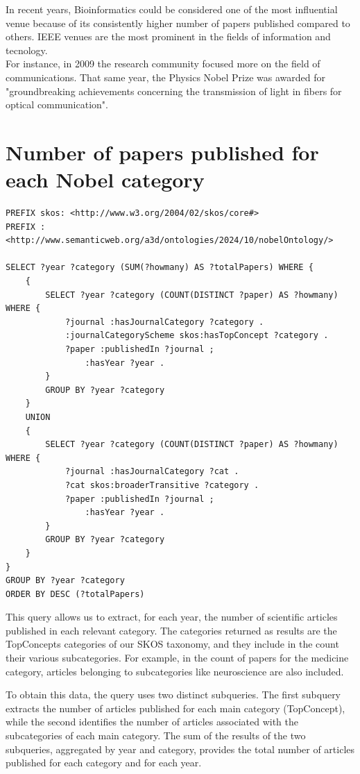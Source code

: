 \documentclass{article}
\begin{document}
In recent years, Bioinformatics could be considered one of the most influential
venue because of its consistently higher number of papers published compared to others.
IEEE venues are the most prominent in the fields of information and tecnology.\\
For instance, in 2009 the research community focused more on the field of
communications.
That same year, the Physics Nobel Prize was awarded for "groundbreaking achievements
concerning the transmission of light in fibers for optical communication".

\newpage

\section{Number of papers published for each Nobel category}
\begin{lstlisting}
PREFIX skos: <http://www.w3.org/2004/02/skos/core#>
PREFIX : <http://www.semanticweb.org/a3d/ontologies/2024/10/nobelOntology/>

SELECT ?year ?category (SUM(?howmany) AS ?totalPapers) WHERE {
    {
        SELECT ?year ?category (COUNT(DISTINCT ?paper) AS ?howmany) WHERE {
            ?journal :hasJournalCategory ?category .
            :journalCategoryScheme skos:hasTopConcept ?category .
            ?paper :publishedIn ?journal ;
                :hasYear ?year .
        }
        GROUP BY ?year ?category
    }
    UNION
    {
        SELECT ?year ?category (COUNT(DISTINCT ?paper) AS ?howmany) WHERE {
            ?journal :hasJournalCategory ?cat .
            ?cat skos:broaderTransitive ?category .
            ?paper :publishedIn ?journal ;
                :hasYear ?year .
        }
        GROUP BY ?year ?category
    }
}
GROUP BY ?year ?category
ORDER BY DESC (?totalPapers)
\end{lstlisting}

\vspace{1em}

This query allows us to extract, for each year, the number of scientific articles published in each relevant category. The categories returned
as results are the TopConcepts categories of our SKOS taxonomy, and they include in the count their various subcategories. For example, in the count
of papers for the medicine category, articles belonging to subcategories like neuroscience are also included.

To obtain this data, the query uses two distinct subqueries. The first subquery extracts the number of articles published for each main category
(TopConcept), while the second identifies the number of articles associated with the subcategories of each main category. The sum of the results of
the two subqueries, aggregated by year and category, provides the total number of articles published for each category and for each year.
\end{document}
